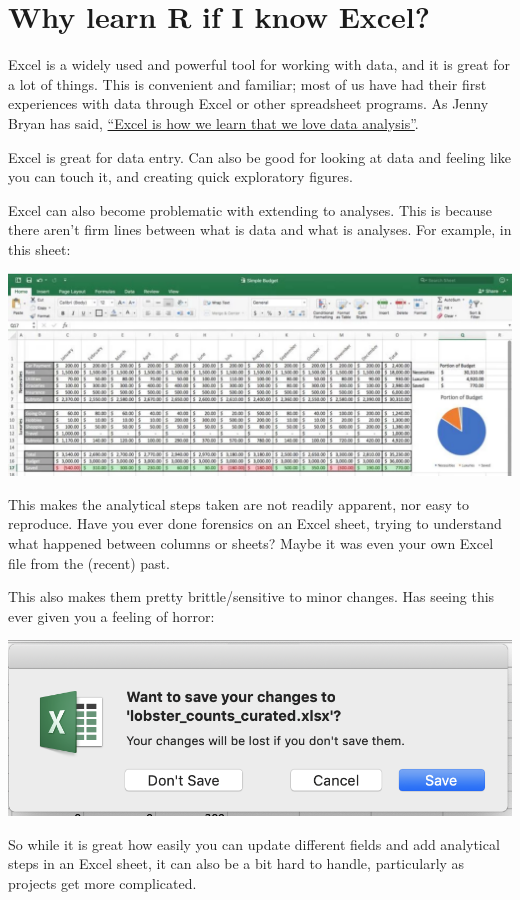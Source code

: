 \documentclass[]{book}
\begin{document}
\hypertarget{why-learn-r-if-i-know-excel}{%
\section{Why learn R if I know Excel?}\label{why-learn-r-if-i-know-excel}}

Excel is a widely used and powerful tool for working with data, and it is great for a lot of things. This is convenient and familiar; most of us have had their first experiences with data through Excel or other spreadsheet programs. As Jenny Bryan has said, \href{}{``Excel is how we learn that we love data analysis''}.

Excel is great for data entry. Can also be good for looking at data and feeling like you can touch it, and creating quick exploratory figures.

Excel can also become problematic with extending to analyses. This is because there aren't firm lines between what is data and what is analyses. For example, in this sheet:

\includegraphics[width=0.7\linewidth]{img/excel-sheet-example}

This makes the analytical steps taken are not readily apparent, nor easy to reproduce. Have you ever done forensics on an Excel sheet, trying to understand what happened between columns or sheets? Maybe it was even your own Excel file from the (recent) past.

This also makes them pretty brittle/sensitive to minor changes. Has seeing this ever given you a feeling of horror:

\includegraphics[width=0.8\linewidth]{img/want-to-save-changes-excel}

So while it is great how easily you can update different fields and add analytical steps in an Excel sheet, it can also be a bit hard to handle, particularly as projects get more complicated.
\end{document}
